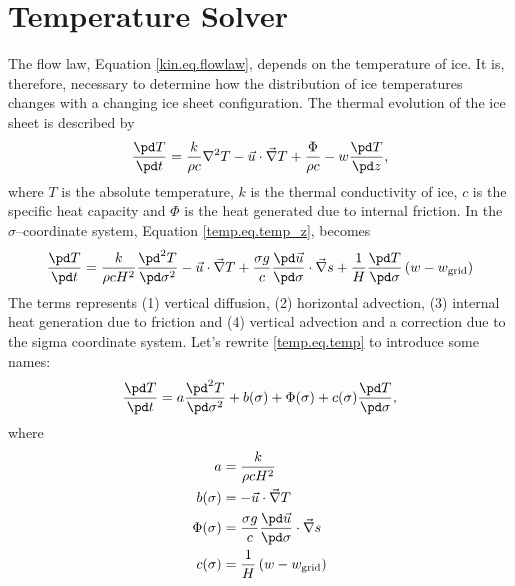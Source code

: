 \section{Temperature Solver}
The flow law, Equation \eqref{kin.eq.flowlaw}, depends on the temperature of ice. It is, therefore, necessary to determine how the distribution of ice temperatures changes with a changing ice sheet configuration. The thermal evolution of the ice sheet is described by
\begin{equation}
  \label{temp.eq.temp_z}
  \frac{\pd T}{\pd t}=\frac{k}{\rho c}\nabla^2T-\vec{u}\cdot\vec\nabla T+\frac\Phi{\rho c}-w\frac{\pd T}{\pd z},
\end{equation}
where $T$ is the absolute temperature, $k$ is the thermal conductivity of ice, $c$ is the specific heat capacity and $\Phi$ is the heat generated due to internal friction. In the $\sigma$--coordinate system, Equation \eqref{temp.eq.temp_z}, becomes
\begin{equation}
  \label{temp.eq.temp}
  \frac{\pd T}{\pd t} = \frac{k}{\rho cH^2}\frac{\pd^2T}{\pd\sigma^2} - \vec{u}\cdot\vec\nabla T + \frac{\sigma g}c\frac{\pd \vec{u}}{\pd\sigma}\cdot\vec\nabla s + \frac1H\frac{\pd T}{\pd\sigma}\left(w-w_{\text{grid}}\right)
\end{equation}
The terms represents (1) vertical diffusion, (2) horizontal advection, (3) internal heat generation due to friction and (4) vertical advection and a correction due to the sigma coordinate system. Let's rewrite \eqref{temp.eq.temp} to introduce some names:
\begin{equation}
  \label{temp.eq.temp2}
  \frac{\pd T}{\pd t} = a\frac{\pd^2T}{\pd\sigma^2} +b(\sigma) + \Phi(\sigma) + c(\sigma)\frac{\pd T}{\pd\sigma},
\end{equation}
where
\begin{subequations}
  \begin{align}
    a&=\frac{k}{\rho cH^2} \\
    \label{temp.eq.hadv}
    b(\sigma)&=-\vec{u}\cdot\vec\nabla T\\
    \Phi(\sigma)&=\frac{\sigma g}c\frac{\pd \vec{u}}{\pd\sigma}\cdot\vec\nabla s \\
    c(\sigma)&=\frac1H\left(w-w_{\text{grid}}\right)
  \end{align}
\end{subequations}

